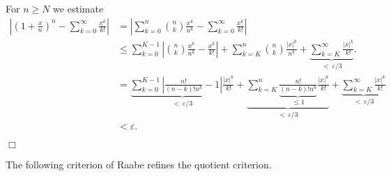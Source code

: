 For $n\geq N$ we estimate
\begin{align*}
\left|\left(1+\frac{x}{n}\right)^{n}-\sum_{k=0}^{\infty}\frac{x^{k}}{k!}\right| 
&= \left|\sum_{k=0}^{n}\binom{n}{k}\frac{x^{k}}{n^{k}}-\sum_{k=0}^{\infty}\frac{x^{k}}{k!} \right|\\
&\leq \sum_{k=0}^{K-1}\left|\binom{n}{k}\frac{x^{k}}{n^{k}}-\frac{x^{k}}{k!}\right|+\sum_{k=K}^{n} \binom{n}{k}\frac{|x|^{k}}{n^{k}}
+\underbrace{\sum_{k=K}^{\infty}\frac{|x|^{k}}{k!}}_{<\,\varepsilon/3}. \\
&= \underbrace{\sum_{k=0}^{K-1}\left|\frac{n!}{(n-k)!n^k}-1\right|\frac{|x|^{k}}{k!}}_{<\,\varepsilon/3}
+\underbrace{\sum_{k=K}^{n} \underbrace{\frac{n!}{(n-k)!n^k}}_{\leq 1}\frac{|x|^{k}}{k!}}_{<\,\varepsilon/3}
+\underbrace{\sum_{k=K}^{\infty}\frac{|x|^{k}}{k!}}_{<\,\varepsilon/3} \\ & < \varepsilon.
\end{align*}

$\Box$

The following criterion of Raabe refines the quotient criterion.


